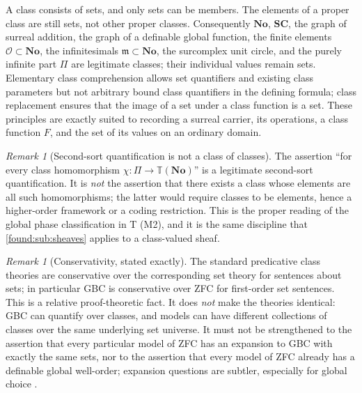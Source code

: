 \documentclass[11pt,letterpaper]{article}
\numberwithin{equation}{section}
\theoremstyle{definition}
\theoremstyle{remark}
\newtheorem{remark}[theorem]{Remark}
\newcommand{\No}{\mathbf{No}}
\newcommand{\SC}{\mathbf{SC}}
\newcommand{\OO}{\mathcal O}
\newcommand{\mm}{\mathfrak m}
\begin{document}
A class consists of sets, and only sets can be members. The elements of a
proper class are still sets, not other proper classes. Consequently $\No$,
$\SC$, the graph of surreal addition, the graph of a definable global function,
the finite elements $\OO\subset\No$, the infinitesimals $\mm\subset\No$, the
surcomplex unit circle, and the purely infinite part $\Pi$ are legitimate
classes; their individual values remain sets. Elementary class comprehension
allows set quantifiers and existing class parameters but not arbitrary bound
class quantifiers in the defining formula; class replacement ensures that the
image of a set under a class function is a set. These principles are exactly
suited to recording a surreal carrier, its operations, a class function $F$,
and the set of its values on an ordinary domain.

\begin{remark}[Second-sort quantification is not a class of classes]\label{found:rem:secondsort}
The assertion ``for every class homomorphism $\chi:\Pi\to\mathbb T(\No)$'' is a
legitimate second-sort quantification. It is \emph{not} the assertion that
there exists a class whose elements are all such homomorphisms; the latter
would require classes to be elements, hence a higher-order framework or a
coding restriction. This is the proper reading of the global phase
classification in T (M2), and it is the same discipline that
\cref{found:sub:sheaves} applies to a class-valued sheaf.
\end{remark}

\begin{remark}[Conservativity, stated exactly]\label{found:rem:conservativity}
The standard predicative class theories are conservative over the corresponding
set theory for sentences about sets; in particular GBC is conservative over ZFC
for first-order set sentences. This is a relative proof-theoretic fact. It does
\emph{not} make the theories identical: GBC can quantify over classes, and
models can have different collections of classes over the same underlying set
universe. It must not be strengthened to the assertion that every particular
model of ZFC has an expansion to GBC with exactly the same sets, nor to the
assertion that every model of ZFC already has a definable global well-order;
expansion questions are subtler, especially for global choice
\cite{found:Williams,found:WilliamsMin,found:ShulmanSize}.
\end{remark}
\end{document}
